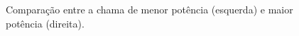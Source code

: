 \begin{figure}[!ht]
	\centering
	\caption{Comparação entre a chama de menor potência (esquerda) e maior potência (direita).}
	\label{fig:chamas}
\end{figure}

